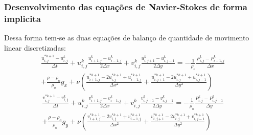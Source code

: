 \documentclass[xcolor=dvipsnames,10pt,aspectratio=169]{beamer}
\begin{document}
	\begin{frame}
		\frametitle{Desenvolvimento das equações de Navier-Stokes  de forma implicita}
		Dessa forma tem-se as duas equações de balanço de quantidade de movimento linear discretizadas:
		\begin{equation}
			\begin{split}
			\frac{u_{i , j}^{\ast k + 1} - u_{i , j}^{k}}{\Delta t} + u_{i , j}^{k}\frac{u_{i + 1 , j}^k - u_{i - 1 , j}^k  }{2 \Delta x} + v_{i , j}^{k}\frac{u_{i , j+ 1}^k - u_{i, j-1}^k  }{2 \Delta y} =  -\frac{1}{\rho_o} \frac{P_{i, j}^k - P_{i - 1 , j}^k}{\Delta x} \\ + \frac{\rho - 	\rho_o}{\rho_o} g_x + \nu \left( \frac{u_{i+1 , j}^{\ast k + 1} - 2 u_{i,j}^{\ast k + 1} + u_{i-1,j}^{\ast k + 1}}{\Delta x^2} + \frac{u_{i , j+1}^{\ast k + 1} - 2 u_{i,j}^{\ast k + 1} + u_{i,j-1}^{\ast k + 1}}{\Delta y^2} \right)
			\end{split}
		\end{equation}
		\begin{equation}
			\begin{split}
			\frac{v_{i , j}^{\ast k + 1} - v_{i , j}^{k}}{\Delta t} + u_{i , j}^{k}\frac{v_{i + 1 , j}^k - v_{i - 1 , j}^k  }{2 \Delta x} + v_{i , j}^{k}\frac{v_{i , j+ 1}^k - v_{i, j-1}^k  }{2 \Delta y} =  -\frac{1}{\rho_o} \frac{P_{i , j}^k - P_{i , j - 1}^k}{\Delta y} \\ + \frac{\rho - \rho_o}{\rho_o} g_y + \nu \left( \frac{v_{i+1 , j}^{\ast k + 1} - 2 v_{i,j}^{\ast k + 1} + v_{i-1,j}^{\ast k + 1}}{\Delta x^2} + \frac{v_{i , j+1}^{\ast k + 1} - 2 v_{i,j}^{\ast k + 1} + v_{i,j-1}^{\ast k + 1}}{\Delta y^2} \right)
			\end{split}
		\end{equation}
	\end{frame}
\end{document}
